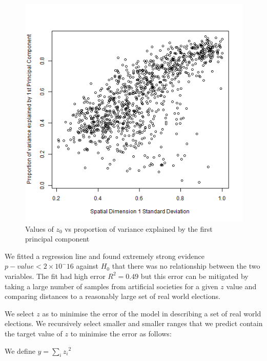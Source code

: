 \documentclass{article}
\begin{document}
\begin{figure}[]
\includegraphics[scale=0.75]{images/spatialvar1_pcavar1.png}
\caption{Values of $z_0$ vs proportion of variance explained by the first principal component}
\label{fig:spatial_var_pca}
\end{figure}

We fitted a regression line and found extremely strong evidence $p-value < 2 \times 10^-16$ against $H_0$ that there was no relationship between the two variables. The fit had high error $R^2=0.49$ but this error can be mitigated by taking a large number of samples from artificial societies for a given $z$ value and comparing distances to a reasonably large set of real world elections.


We select $z$ as to minimise the error of the model in describing a set of real world elections. We recursively select smaller and smaller ranges that we predict contain the target value of $z$ to minimise the error as follows:


We define $y = \sum_i {z_i}^2$ 
\end{document}
